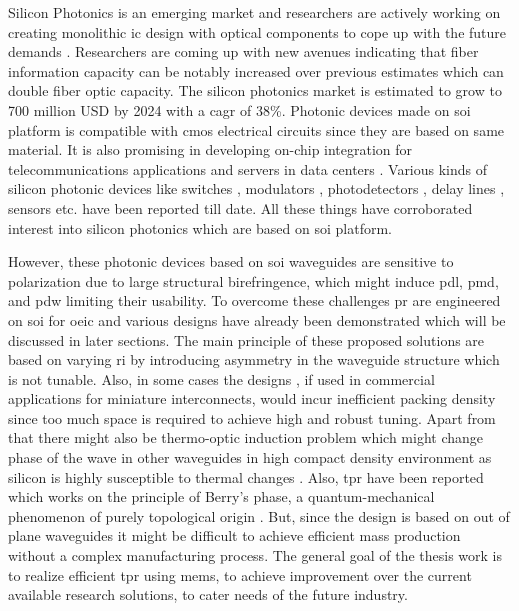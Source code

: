 \documentclass[../report.tex]{subfiles}
\begin{document}
Silicon Photonics is an emerging market and researchers are actively working on creating monolithic \gls{ic} design with optical components to cope up with the future demands \cite{optical_linking}. Researchers are coming up with new avenues indicating that fiber information capacity can be notably increased over previous estimates \cite{temprana_overcoming_2015} which can double fiber optic capacity. The silicon photonics market is estimated to grow to 700 million USD by 2024 \cite{silicon_photonics_growth_2015} with a \gls{cagr} of 38\%. Photonic devices made on \gls{soi} platform is compatible with \gls{cmos} electrical circuits since they are based on same material. It is also promising in developing on-chip integration for telecommunications applications and servers in data centers \cite{jalali_silicon_2006}. Various kinds of silicon photonic devices like switches \cite{wu_mems-enabled_2015,nikolova_scaling_2015,lu_low-power_2014}, modulators \cite{dong_silicon_2015,chen_generation_2013}, photodetectors \cite{urino_demonstration_2012,chang_high-power_2015}, delay lines \cite{garcia_design_2015,mattarei_variable_2014}, sensors \cite{janz_silicon_2007,lim_laser_2010,ryckeboer_glucose_2014} etc. have been reported till date. All these things have corroborated interest into silicon photonics which are based on \gls{soi} platform.\par   

However, these photonic devices based on \gls{soi} waveguides are sensitive to polarization due to large structural birefringence, which might induce \gls{pdl}, \gls{pmd}, and \gls{pdw} limiting their usability. To overcome these challenges \gls{pr} are engineered on \gls{soi} for \gls{oeic} and various designs have already been demonstrated \cite{xie_efficient_2015,velasco_ultracompact_2012,leung_numerical_2011,wang_design_2014,dai_novel_2011,wirth_efficient_2012,chen_compact_2011} which will be discussed in later sections. The main principle of these proposed solutions are based on varying \gls{ri} by introducing asymmetry in the waveguide structure which is not tunable. Also, in some cases the designs \cite{sarmiento-merenguel_demonstration_2015}, if used in commercial applications for miniature interconnects, would incur inefficient packing density since too much space is required to achieve high and robust tuning. Apart from that there might also be thermo-optic induction problem which might change phase of the wave in other waveguides in high compact density environment as silicon is highly susceptible to thermal changes \cite{ibrahim_athermal_2012}. Also, \gls{tpr} have been reported which works on the principle of Berry’s phase, a quantum-mechanical phenomenon of purely topological origin \cite{xu_electrically_2014}. But, since the design is based on out of plane waveguides it might be difficult to achieve efficient mass production without a complex manufacturing process. The general goal of the thesis work is to realize efficient \gls{tpr} using \gls{mems}, to achieve improvement over the current available research solutions, to cater needs of the future industry.    
\end{document}
